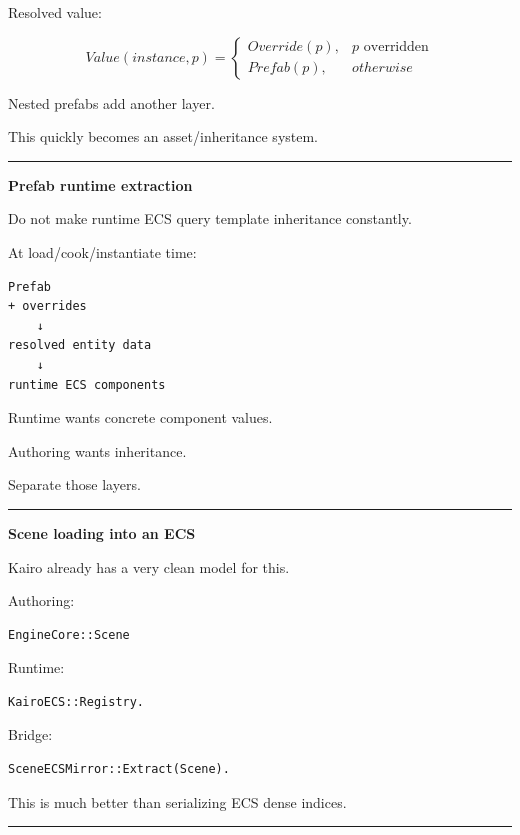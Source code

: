 Resolved value:

\[
Value(instance,p)=
\begin{cases}
Override(p),&p\text{ overridden}\\
Prefab(p),&otherwise
\end{cases}
\]

Nested prefabs add another layer.

This quickly becomes an asset/inheritance system.

\begin{center}\rule{0.5\linewidth}{0.5pt}\end{center}

\textbf{Prefab runtime extraction}

Do not make runtime ECS query template inheritance constantly.

At load/cook/instantiate time:

\begin{verbatim}
Prefab
+ overrides
    ↓
resolved entity data
    ↓
runtime ECS components
\end{verbatim}

Runtime wants concrete component values.

Authoring wants inheritance.

Separate those layers.

\begin{center}\rule{0.5\linewidth}{0.5pt}\end{center}

\textbf{Scene loading into an ECS}

Kairo already has a very clean model for this.

Authoring:

\begin{verbatim}
EngineCore::Scene
\end{verbatim}

Runtime:

\begin{verbatim}
KairoECS::Registry.
\end{verbatim}

Bridge:

\begin{verbatim}
SceneECSMirror::Extract(Scene).
\end{verbatim}

This is much better than serializing ECS dense indices.

\begin{center}\rule{0.5\linewidth}{0.5pt}\end{center}

